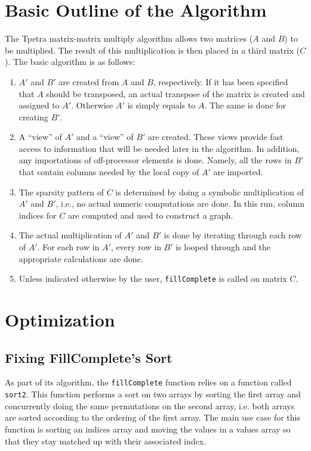 \documentclass{article}
\newcommand{\Aprime}{\ensuremath{A'}\xspace}
\newcommand{\Bprime}{\ensuremath{B'}\xspace}
\begin{document}
\section{Basic Outline of the Algorithm}
The Tpetra matrix-matrix multiply algorithm allows two matrices ($A$ and $B$) to be multiplied. The result of this 
multiplication is then placed in a third matrix ($C$).
The basic algorithm is as follows:
\begin{enumerate}
  \item \Aprime and \Bprime are created from $A$ and $B$, respectively. If it has been specified that $A$ should be transposed, an actual 
  transpose of the matrix is created and assigned to \Aprime. Otherwise \Aprime is simply equals to $A$. The same is done for 
  creating \Bprime.
  \item A ``view'' of \Aprime and a ``view'' of \Bprime are created. These views provide fast access to information that 
  will be needed later in the algorithm. In addition, any importations of off-processor elements is done. Namely, all the 
  rows in \Bprime that contain columns needed by the local copy of \Aprime are imported.
  \item The sparsity pattern of $C$ is determined by doing a symbolic multiplication of \Aprime and \Bprime, i.e., no actual
  numeric computations are done. In this run, 
  column indices for $C$ are computed and used to construct a graph.
  \item The actual multiplication of \Aprime and \Bprime is done by iterating through each row of \Aprime. For each row in 
  \Aprime, every row in \Bprime is looped through and the appropriate calculations are done.
  \item Unless indicated otherwise by the user, \verb!fillComplete! is called on matrix $C$.
\end{enumerate}

\section{Optimization}

\subsection{Fixing FillComplete's Sort}
As part of its algorithm, the \verb!fillComplete! function relies on a function called \verb!sort2!. This function performs a sort 
on two arrays by sorting the first array and concurrently doing the same permutations on the second array, 
i.e. both arrays are sorted according to the ordering of the first array. The main use case for this function is sorting 
an indices array and moving the values in a values array so that they stay matched up with their associated index.
\end{document}
